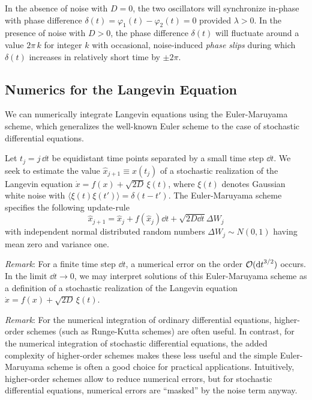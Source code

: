 \documentclass{notebook}
\makeatletter
\newcommand{\Remark}{\textit{Remark}} %
\makeatother
\begin{document}
In the absence of noise with $D=0$, the two oscillators will synchronize in-phase 
with phase difference $\delta(t)=\varphi_1(t)-\varphi_2(t)=0$ provided $\lambda>0$. 
In the presence of noise with $D>0$, the phase difference $\delta(t)$ will fluctuate around  a value $2\pi\,k$ for integer $k$ with occasional, noise-induced \textit{phase slips} during which  $\delta(t)$ increases in relatively short time by $\pm 2\pi$.


\subsection*{Numerics for the Langevin Equation}

We can numerically integrate Langevin equations using the Euler-Maruyama scheme, 
which generalizes the well-known Euler scheme to the case of stochastic differential equations.

\begin{theorem}
Let $t_j=j\,\dd{t}$ be equidistant time points separated by a small time step $\dd{t}$.
We seek to estimate the value
$\hat{x}_{j+1} \equiv x(t_j)$
of a stochastic realization of the Langevin equation 
$\dot{x} = f(x) + \sqrt{2D} \, \xi(t)$, 
where $\xi(t)$ denotes Gaussian white noise with $\langle \xi(t)\xi(t')\rangle = \delta(t-t')$.
The Euler-Maruyama scheme specifies the following update-rule
	\begin{equation}
	\hat{x}_{j+1} = \hat{x}_j + f(\hat{x}_j) \dd{t} + \sqrt{2 D \dd{t}} \Delta W_j
	\end{equation}
	with independent normal distributed random numbers $\Delta W_j \sim N(0,1)$ having mean zero and variance one.
\end{theorem}

\Remark: 
For a finite time step $\dd{t}$, a numerical error on the order $\mathcal{O}(\dd{t}^{3/2})$ occurs.
In the limit $\dd{t}\rightarrow 0$, we may interpret solutions of this Euler-Maruyama scheme as a definition of a stochastic realization of the Langevin equation $\dot{x} = f(x) + \sqrt{2D} \, \xi(t)$.

\Remark:
For the numerical integration of ordinary differential equations, higher-order schemes (such as Runge-Kutta schemes) are often useful. 
In contrast, for the numerical integration of stochastic differential equations, 
the added complexity of higher-order schemes makes these less useful and the simple Euler-Maruyama scheme is often a good choice for practical applications. 
Intuitively, higher-order schemes allow to reduce numerical errors, 
but for stochastic differential equations, numerical errors are ``masked'' by the noise term anyway.
\end{document}
